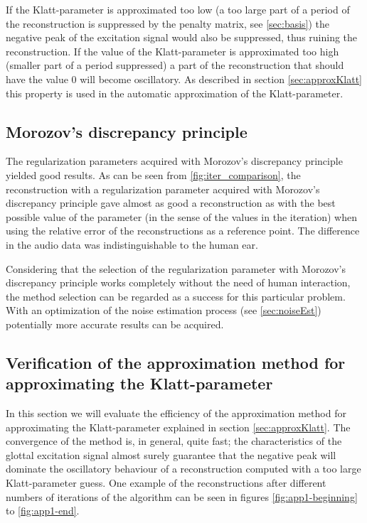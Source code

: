 \documentclass[12pt,a4]{article}
\begin{document}
If the Klatt-parameter is approximated too low (a too large part of a period of the reconstruction is suppressed by the penalty matrix, see \cref{sec:basis}) the negative peak of the excitation signal would also be suppressed, thus ruining the reconstruction. If the value of the Klatt-parameter is approximated too high (smaller part of a period suppressed) a part of the reconstruction that should have the value 0 will become oscillatory. As described in section  \ref{sec:approxKlatt} this property is used in the automatic approximation of the Klatt-parameter.

\subsection{Morozov's discrepancy principle}
\label{sec:morozow}

The regularization parameters acquired with Morozov's discrepancy principle
yielded good results. As can be seen from \cref{fig:iter_comparison}, the reconstruction with a regularization parameter acquired with Morozov's discrepancy principle gave almost as good a reconstruction as with the best possible value of the parameter (in the sense of the values in the iteration) when using the relative error of the reconstructions as a reference point. The difference in the audio data was indistinguishable to the human ear.

Considering that the selection of the regularization parameter with Morozov's discrepancy principle works completely without the need of human interaction, the method selection can be regarded as a success for this particular problem. With an optimization of the noise estimation process (see \ref{sec:noiseEst}) potentially more accurate results can be acquired.

\subsection{Verification of the approximation method for \\approximating the Klatt-parameter}

In this section we will evaluate the efficiency of the approximation method for approximating the Klatt-parameter explained in section \ref{sec:approxKlatt}. The convergence of the method is, in general, quite fast; the characteristics of the glottal excitation signal almost surely guarantee that the negative peak will dominate the oscillatory behaviour of a reconstruction computed with a too large Klatt-parameter guess.
One example of the reconstructions after different numbers of iterations of the algorithm can be seen in figures \ref{fig:app1-beginning} to \ref{fig:app1-end}.
\end{document}
